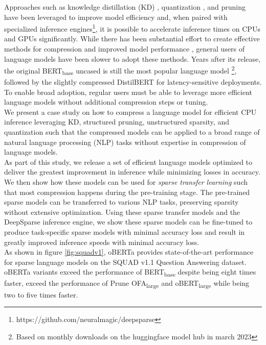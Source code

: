 Approaches such as knowledge distillation (KD) \cite{Hinton2015DistillingTK}, quantization \cite{Zafrir2019Q8BERTQ8}, and pruning \cite{Kurtic2022TheOB} have been leveraged to improve model efficiency and, when paired with specialized inference engines\footnote{https://github.com/neuralmagic/deepsparse}, it is possible to accelerate inference times on CPUs and GPUs significantly. While there has been substantial effort to create effective methods for compression \cite{Jiao2020TinyBERTDB, Sun2020MobileBERTAC} and improved model performance \cite{Liu2019RoBERTaAR}, general users of language models have been slower to adopt these methods. Years after its release, the original  BERT\textsubscript{base} uncased \cite{Devlin2019BERTPO} is still the most popular language model \footnote{Based on monthly downloads on the huggingface model hub in march 2023}, followed by the slightly compressed DistilBERT \cite{Sanh2019DistilBERTAD} for latency-sensitive deployments.
To enable broad adoption, regular users must be able to leverage more efficient language models without additional compression steps or tuning.\\
We present a case study on how to compress a language model for efficient CPU inference leveraging KD, structured pruning, unstructured sparsity, and quantization such that the compressed models can be applied to a broad range of natural language processing (NLP) tasks without expertise in compression of language models. \\
As part of this study, we release a set of efficient language models optimized to deliver the greatest improvement in inference while minimizing losses in accuracy. We then show how these models can be used for \textit{sparse transfer learning} \cite{Iofinova2021HowWD, Zafrir2021PruneOF} such that most compression happens during the pre-training stage. The pre-trained sparse models can be transferred to various NLP tasks, preserving sparsity without extensive optimization. Using these sparse transfer models and the DeepSparse inference engine, we show these sparse models can be fine-tuned to produce task-specific sparse models with minimal accuracy loss and result in greatly improved inference speeds with minimal accuracy loss.\\
As shown in figure \ref{fig:squadv1}, oBERTa provides state-of-the-art performance for sparse language models on the SQUAD v1.1 Question Answering dataset. oBERTa variants exceed the performance of BERT\textsubscript{base} despite being eight times faster, exceed the performance of Prune OFA\textsubscript{large} and oBERT\textsubscript{large} while being two to five times faster.
